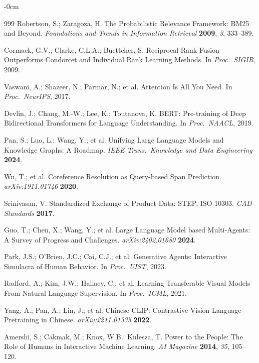 \documentclass[applsci,article,submit,pdftex,moreauthors]{Definitions/mdpi}
\begin{document}
\begin{adjustwidth}{-\extralength}{0cm}
{\begin{thebibliography}{999}
Robertson, S.; Zaragoza, H. The Probabilistic Relevance Framework: BM25 and Beyond. {\em Foundations and Trends in Information Retrieval} {\bf 2009}, {\em 3}, 333--389.

Cormack, G.V.; Clarke, C.L.A.; Buettcher, S. Reciprocal Rank Fusion Outperforms Condorcet and Individual Rank Learning Methods. In {\em Proc.\ SIGIR}, 2009.

Vaswani, A.; Shazeer, N.; Parmar, N.; et al. Attention Is All You Need. In {\em Proc.\ NeurIPS}, 2017.

Devlin, J.; Chang, M.-W.; Lee, K.; Toutanova, K. BERT: Pre-training of Deep Bidirectional Transformers for Language Understanding. In {\em Proc.\ NAACL}, 2019.

Pan, S.; Luo, L.; Wang, Y.; et al. Unifying Large Language Models and Knowledge Graphs: A Roadmap. {\em IEEE Trans.\ Knowledge and Data Engineering} {\bf 2024}.

Wu, T.; et al. Coreference Resolution as Query-based Span Prediction. {\em arXiv:1911.01746} {\bf 2020}.

Srinivasan, V. Standardized Exchange of Product Data: STEP, ISO 10303. {\em CAD Standards} {\bf 2017}.

Guo, T.; Chen, X.; Wang, Y.; et al. Large Language Model based Multi-Agents: A Survey of Progress and Challenges. {\em arXiv:2402.01680} {\bf 2024}.

Park, J.S.; O'Brien, J.C.; Cai, C.J.; et al. Generative Agents: Interactive Simulacra of Human Behavior. In {\em Proc.\ UIST}, 2023.

Radford, A.; Kim, J.W.; Hallacy, C.; et al. Learning Transferable Visual Models From Natural Language Supervision. In {\em Proc.\ ICML}, 2021.

Yang, A.; Pan, A.; Lin, J.; et al. Chinese CLIP: Contrastive Vision-Language Pretraining in Chinese. {\em arXiv:2211.01335} {\bf 2022}.

Amershi, S.; Cakmak, M.; Knox, W.B.; Kulesza, T. Power to the People: The Role of Humans in Interactive Machine Learning. {\em AI Magazine} {\bf 2014}, {\em 35}, 105--120.


\end{thebibliography}}
\end{adjustwidth}
\end{document}
